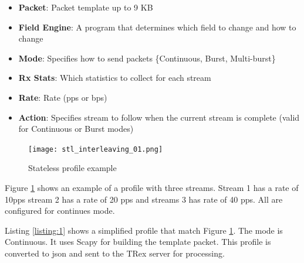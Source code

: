 \documentclass[letterpaper]{article}
\begin{document}
\begin{itemize}
\item \textbf{Packet}: Packet template up to 9 KB
\item \textbf{Field Engine}: A program that determines which field to change and how to change 
\item \textbf{Mode}: Specifies how to send packets \{Continuous, Burst, Multi-burst\}
\item \textbf{Rx Stats}: Which statistics to collect for each stream
\item \textbf{Rate}: Rate (pps or bps) 
\item \textbf{Action}: Specifies stream to follow when the current stream is complete (valid for Continuous or Burst modes)
\end{itemize}

\begin{figure}[h]
\texttt{[image: stl\_interleaving\_01.png]}
\caption{Stateless profile example}
\label{fig:stlhello}
\end{figure}

Figure \ref{fig:stlhello} shows an example of a profile with three streams.  
Stream 1 has a rate of 10pps stream 2 has a rate of 20 pps and streams 3 has rate of 40 pps. All are configured for continues mode.

Listing \ref{listing:1} shows a simplified profile that match Figure \ref{fig:stlhello}. The mode is Continuous. 
It uses Scapy for building the template packet. This profile is converted to json and sent to the TRex server for processing. 

  
\end{document}
